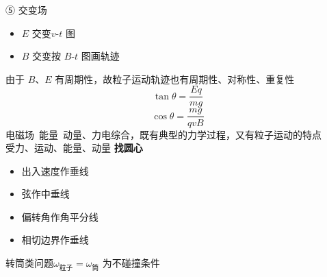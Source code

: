 ⑤ 交变场
\begin{itemize}
\item $E$ 交变\quad $v$-$t$ 图
\item $B$ 交变\quad 按 $B$-$t$ 图画轨迹
\end{itemize}
由于 $B$、$E$ 有周期性，故粒子运动轨迹也有周期性、对称性、重复性
\[
\tan\theta=\frac{Eq}{mg}
\]
\[
\cos\theta=\frac{mg}{qvB}
\]
电磁场\ 能量\ 动量、力电综合，既有典型的力学过程，又有粒子运动的特点\\
\hspace*{2em}受力、运动、能量、动量
\textbf{找圆心}
\begin{itemize}
\item 出入速度作垂线 %
\item 弦作中垂线 %
\item 偏转角作角平分线
\item 相切边界作垂线
\end{itemize}
转筒类问题\quad $\omega_{\text{粒子}}=\omega_{\text{筒}}$ 为不碰撞条件 %

